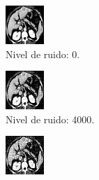 \documentclass[a4paper]{article}
\begin{document}
\begin{figure}
\centering
\begin{subfigure}{0.4\linewidth}
  \centering
  \includegraphics[width=0.6\linewidth]{ruido/tomo2-ruido0}
  \caption{Nivel de ruido: 0.}
\end{subfigure}
\begin{subfigure}{0.4\linewidth}
  \centering
  \includegraphics[width=0.6\linewidth]{ruido/tomo2-ruido4000}
  \caption{Nivel de ruido: 4000.}
\end{subfigure}
\begin{subfigure}{0.4\linewidth}
  \centering
  \includegraphics[width=0.6\linewidth]{ruido/tomo2-ruido8000}

\end{subfigure}
\end{figure}
\end{document}
